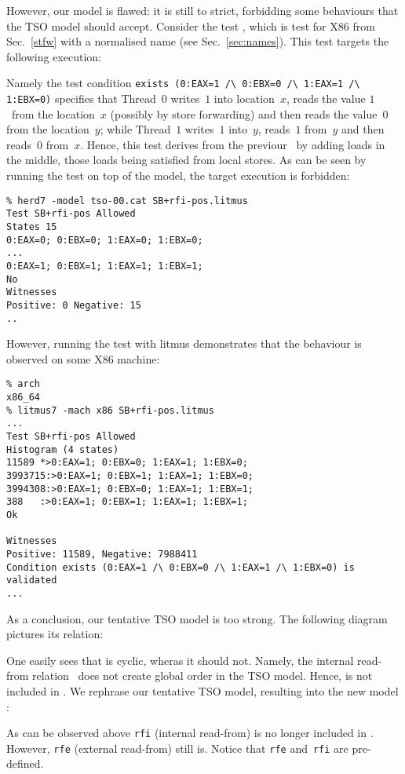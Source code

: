 However,
our model  is flawed: it is still to strict,
forbidding some behaviours that the TSO model should accept.
Consider the test ,
which is test  for X86 from Sec.~\ref{stfw} with a normalised name (see Sec.~\ref{sec:names}).
This test targets the following execution:
\begin{center}\end{center}
Namely the test condition
\verb+exists (0:EAX=1 /\ 0:EBX=0 /\ 1:EAX=1 /\ 1:EBX=0)+
specifies that Thread~$0$ writes~$1$ into location~$x$,
reads the value $1$~from the location~$x$ (possibly by store forwarding) and
then reads the value~$0$ from the location~$y$;
while Thread~$1$ writes~$1$ into~$y$,
reads~$1$ from~$y$ and then reads~$0$ from~$x$.
Hence, this test derives from the previour~
by adding loads in the middle, those loads
being  satisfied from local stores.
As can be seen by running the test on top of the 
model, the target execution is forbidden:
\begin{verbatim}
% herd7 -model tso-00.cat SB+rfi-pos.litmus 
Test SB+rfi-pos Allowed
States 15
0:EAX=0; 0:EBX=0; 1:EAX=0; 1:EBX=0;
...
0:EAX=1; 0:EBX=1; 1:EAX=1; 1:EBX=1;
No
Witnesses
Positive: 0 Negative: 15
..
\end{verbatim}
However, running the test with litmus demonstrates that the behaviour
is observed on some X86 machine:
\begin{verbatim}
% arch
x86_64
% litmus7 -mach x86 SB+rfi-pos.litmus
...
Test SB+rfi-pos Allowed
Histogram (4 states)
11589 *>0:EAX=1; 0:EBX=0; 1:EAX=1; 1:EBX=0;
3993715:>0:EAX=1; 0:EBX=1; 1:EAX=1; 1:EBX=0;
3994308:>0:EAX=1; 0:EBX=0; 1:EAX=1; 1:EBX=1;
388   :>0:EAX=1; 0:EBX=1; 1:EAX=1; 1:EBX=1;
Ok

Witnesses
Positive: 11589, Negative: 7988411
Condition exists (0:EAX=1 /\ 0:EBX=0 /\ 1:EAX=1 /\ 1:EBX=0) is validated
...
\end{verbatim}
As a conclusion, our tentative TSO model is too strong.
The following diagram pictures its  relation:
\begin{center}\end{center}
One easily sees that  is cyclic, wheras it should not.
Namely, the internal read-from relation~ does
not create global order in the TSO model.
Hence,  is not included in .
We rephrase our tentative TSO model, resulting into the new model
:

As can be observed above \texttt{rfi} (internal read-from) is no longer
included in . However, \texttt{rfe} (external read-from)
still is. Notice that \texttt{rfe} and~\texttt{rfi} are pre-defined.


